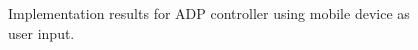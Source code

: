 \begin{figure}
{    \label{fig:AndroidADPPitchVolt}
    }
    \caption{Implementation results for ADP controller using mobile device as user input.}
    \label{fig:AndroidADP}
\end{figure}




